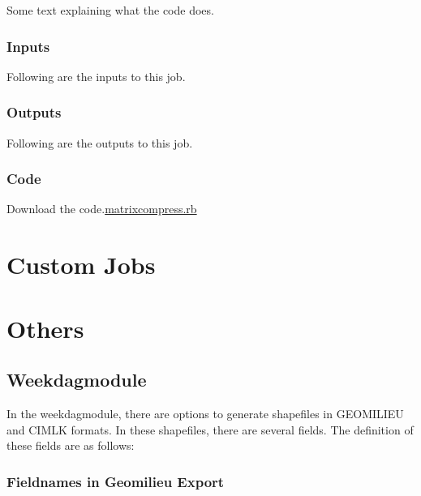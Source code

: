 \documentclass[
  letterpaper,
  DIV=11,
  numbers=noendperiod]{scrreprt}
\begin{document}
Some text explaining what the code does.

\section{Inputs}

Following are the inputs to this job.

\section{Outputs}

Following are the outputs to this job.

\section{Code}

Download the code.\href{../first.rb}{matrixcompress.rb}

\part{Custom Jobs}

\part{Others}

\chapter{Weekdagmodule}\label{weekdagmodule}

In the weekdagmodule, there are options to generate shapefiles in
GEOMILIEU and CIMLK formats. In these shapefiles, there are several
fields. The definition of these fields are as follows:

\section{Fieldnames in Geomilieu
Export}\label{fieldnames-in-geomilieu-export}
\end{document}
